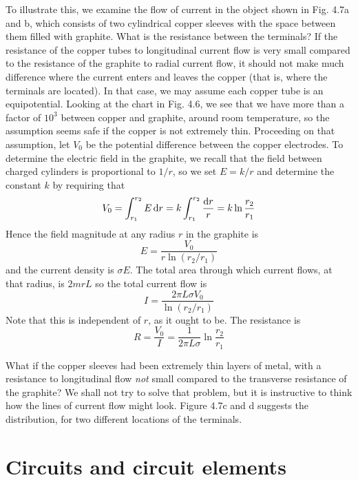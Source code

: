 To illustrate this, we examine the flow of current in the object
shown in Fig. 4.7a and b, which consists of two cylindrical copper
sleeves with the space between them filled with graphite. What is
the resistance between the terminals? If the resistance of the copper
tubes to longitudinal current flow is very small compared to the
resistance of the graphite to radial current flow, it should not make
much difference where the current enters and leaves the copper (that
is, where the terminals are located). In that case, we may assume
each copper tube is an equipotential. Looking at the chart in Fig. 4.6,
we see that we have more than a factor of $10^3$ between copper and
graphite, around room temperature, so the assumption seems safe if
the copper is not extremely thin. Proceeding on that assumption, let
$V_0$ be the potential difference between the copper electrodes. To
determine the electric field in the graphite, we recall that the field
between charged cylinders is proportional to $1/r$, so we set $E = k/r$
and determine the constant $k$ by requiring that
\begin{equation}
  V_0 = \int_{r_1}^{r_2} E\operatorname{d\!} r = k \int_{r_1}^{r_2} \frac{\operatorname{d\!} r}{r} = k \ln\frac{r_2}{r_1}
\end{equation}
Hence the field magnitude at any radius $r$ in the graphite is
\begin{equation}
  E = \frac{V_0}{r\ln(r_2/r_1)}
\end{equation}
and the current density is $\sigma E$. The total area through which current
flows, at that radius, is $2mrL$ so the total current flow is
\begin{equation}
  I = \frac{2\pi L\sigma V_0}{\ln(r_2/r_1)}
\end{equation}
Note that this is independent of $r$, as it ought to be. The resistance
is
\begin{equation}
  R = \frac{V_0}{I} = \frac{1}{2\pi L\sigma}\ln\frac{r_2}{r_1}
\end{equation}

What if the copper sleeves had been extremely thin layers of metal,
with a resistance to longitudinal flow \emph{not} small compared to the
transverse resistance of the graphite? We shall not try to solve that
problem, but it is instructive to think how the lines of current flow
might look. Figure 4.7c and d suggests the distribution, for two
different locations of the terminals.

\section{Circuits and circuit elements}

